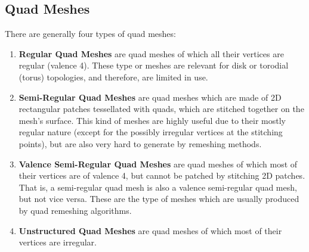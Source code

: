 \subsection{Quad Meshes}
There are generally four types of quad meshes:
\begin{enumerate}
\item \textbf{Regular Quad Meshes} are quad meshes of which all their vertices are regular (valence 4). These type or meshes are relevant for disk or torodial (torus) topologies, and therefore, are limited in use.
\item \textbf{Semi-Regular Quad Meshes} are quad meshes which are made of 2D rectangular patches tessellated with quads, which are stitched together on the mesh's surface. This kind of meshes are highly useful due to their mostly regular nature (except for the possibly irregular vertices at the stitching points), but are also very hard to generate by remeshing methods.
\item \textbf{Valence Semi-Regular Quad Meshes} are quad meshes of which most of their vertices are of valence 4, but cannot be patched by stitching 2D patches. That is, a semi-regular quad mesh is also a valence semi-regular quad mesh, but not vice versa. These are the type of meshes which are usually produced by quad remeshing algorithms.
\item \textbf{Unstructured Quad Meshes} are quad meshes of which most of their vertices are irregular.
\end{enumerate}
